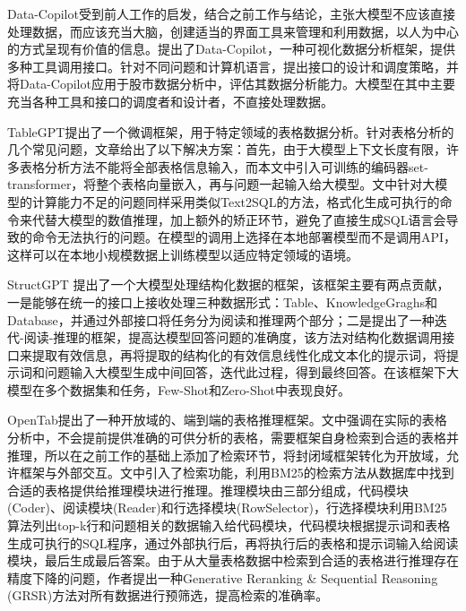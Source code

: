 Data-Copilot\cite{zhangDataCopilotBridgingBillions2023}受到前人工作的启发，结合之前工作与结论，主张大模型不应该直接处理数据，而应该充当大脑，创建适当的界面工具来管理和利用数据，以人为中心的方式呈现有价值的信息。提出了Data-Copilot，一种可视化数据分析框架，提供多种工具调用接口。针对不同问题和计算机语言，提出接口的设计和调度策略，并将Data-Copilot应用于股市数据分析中，评估其数据分析能力。大模型在其中主要充当各种工具和接口的调度者和设计者，不直接处理数据。

TableGPT\cite{zhaTableGPTUnifyingTables2023}提出了一个微调框架，用于特定领域的表格数据分析。针对表格分析的几个常见问题，文章给出了以下解决方案：首先，由于大模型上下文长度有限，许多表格分析方法不能将全部表格信息输入，而本文中引入可训练的编码器set-transformer，将整个表格向量嵌入，再与问题一起输入给大模型。文中针对大模型的计算能力不足的问题同样采用类似Text2SQL的方法，格式化生成可执行的命令来代替大模型的数值推理，加上额外的矫正环节，避免了直接生成SQL语言会导致的命令无法执行的问题。在模型的调用上选择在本地部署模型而不是调用API，这样可以在本地小规模数据上训练模型以适应特定领域的语境。

StructGPT \cite{jiangStructGPTGeneralFramework2023}提出了一个大模型处理结构化数据的框架，该框架主要有两点贡献，一是能够在统一的接口上接收处理三种数据形式：Table、KnowledgeGraghs和Database，并通过外部接口将任务分为阅读和推理两个部分；二是提出了一种迭代-阅读-推理的框架，提高达模型回答问题的准确度，该方法对结构化数据调用接口来提取有效信息，再将提取的结构化的有效信息线性化成文本化的提示词，将提示词和问题输入大模型生成中间回答，迭代此过程，得到最终回答。在该框架下大模型在多个数据集和任务，Few-Shot和Zero-Shot中表现良好。

OpenTab\cite{kongOpenTabAdvancingLarge2024}提出了一种开放域的、端到端的表格推理框架。文中强调在实际的表格分析中，不会提前提供准确的可供分析的表格，需要框架自身检索到合适的表格并推理，所以在之前工作\cite{chenLabelfreeNodeClassification2023}的基础上添加了检索环节，将封闭域框架转化为开放域，允许框架与外部交互。文中引入了检索功能，利用BM25的检索方法从数据库中找到合适的表格提供给推理模块进行推理。推理模块由三部分组成，代码模块(Coder)、阅读模块(Reader)和行选择模块(RowSelector)，行选择模块利用BM25算法列出top-k行和问题相关的数据输入给代码模块，代码模块根据提示词和表格生成可执行的SQL程序，通过外部执行后，再将执行后的表格和提示词输入给阅读模块，最后生成最后答案。由于从大量表格数据中检索到合适的表格进行推理存在精度下降的问题，作者提出一种Generative Reranking \& Sequential Reasoning (GRSR)方法对所有数据进行预筛选，提高检索的准确率。

